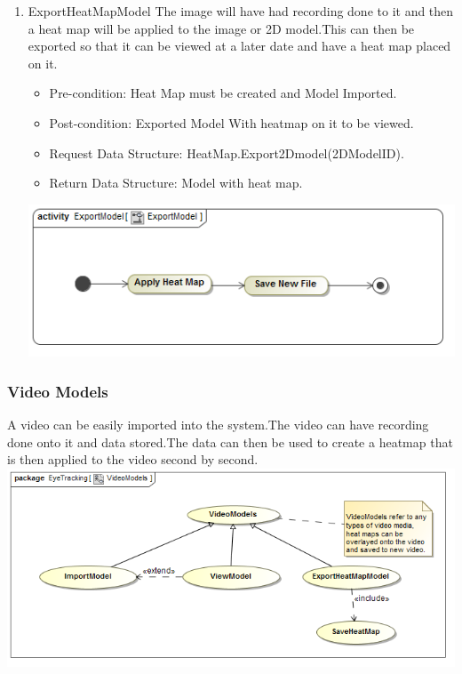 \begin{enumerate}
		\item{ExportHeatMapModel}
		The image will have had recording done to it and then a heat map will be applied to the image or 2D model.This can then be exported so that it can be viewed at a later date and have a heat map placed on it. 
		\begin{itemize}
			\item Pre-condition: Heat Map must be created and Model Imported.
			\item Post-condition: Exported Model With heatmap on it to be viewed.
			\item Request Data Structure: HeatMap.Export2Dmodel(2DModelID).
			\item Return Data Structure: Model with heat map.
		\end{itemize}
		
		\includegraphics[scale=0.5]{Diagrams/Activity_Diagram__ExportModel__ExportModel.png}

	\end{enumerate}
		
		
	\subsubsection{Video Models}
	A video can be easily imported into the system.The video can have recording done onto it and data stored.The data can then be used to create a heatmap that is then applied to the video second by second.
	\newline
	\includegraphics[scale=0.5]{Diagrams/Use_Case_Diagram__VideoModels.png}
		
